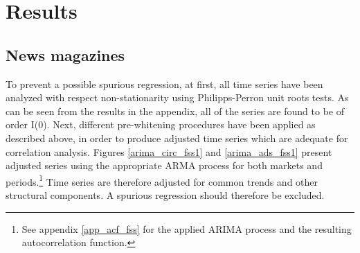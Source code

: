 \documentclass[12pt,a4paper,notitlepage]{article}
\begin{document}

\section{Results}

\subsection{News magazines}

To prevent a possible spurious regression, at first, all time series have been analyzed with respect non-stationarity using Philipps-Perron unit roots tests. As can be seen from the results in the appendix, all of the series are found to be of order I(0). Next, different pre-whitening procedures have been applied as described above, in order to produce adjusted time series which are adequate for correlation analysis. Figures \ref{arima_circ_fss1} and \ref{arima_ads_fss1} present adjusted series using the appropriate ARMA process for both markets and periods.\footnote{See appendix \ref{app_acf_fss} for the applied ARIMA process and the resulting autocorrelation function.} Time series are therefore adjusted for common trends and other structural components. A spurious regression should therefore be excluded.  

%	
%	
%
%	
%	
\end{document}
